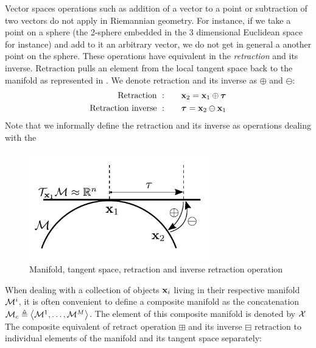 Vector spaces operations such as addition of a vector to a point or subtraction of two vectors do not apply in Riemannian geometry. For instance, if we
take a point on a sphere (the 2-sphere embedded in the 3 dimensional Euclidean space for instance) and add to it an arbitrary vector, we do not get in general
a another point on the sphere. These operations have equivalent in the \textit{retraction} and its inverse.
Retraction pulls an element from the local tangent space back to the manifold as represented in . We denote retraction and its inverse as 
$\oplus$ and $\ominus$:
%
\begin{align}
            \text{Retraction}~:&\quad\quad {\bf x}_2 = {\bf x}_1 \oplus {\bm \tau}   \\
    \text{Retraction inverse}~:&\quad\quad {\bm \tau} = {\bf x}_2 \ominus {\bf x}_1  \\
\end{align}
%
Note that we informally define the retraction and its inverse as operations dealing with the 
\begin{figure}[h]
    \centering
    \includegraphics[width=0.7\textwidth]{figures/manifold.pdf}
    \caption{Manifold, tangent space, retraction and inverse retraction operation}
\end{figure}

When dealing with a collection of objects ${\bf x}_i$ living in their respective manifold $\mathcal{M}^i$, it is often convenient to define a composite manifold
as the concatenation $\mathcal{M}_c \triangleq \left<\mathcal{M}^1, \dots, \mathcal{M}^M \right>$. The element of this composite manifold is denoted by $\mathcal{X}$
The composite equivalent of retract operation $\boxplus$ and 
its inverse $\boxminus$ retraction to individual elements of the manifold and its tangent space separately:


